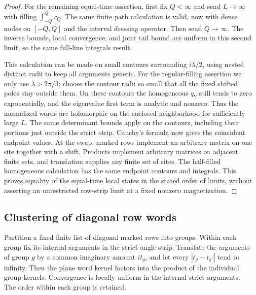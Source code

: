\begin{proof}
For the remaining equal-time assertion, first fix $Q<\infty$
and send $L\to\infty$ with filling
$\int_{-Q}^Qr_Q$.  The same finite path calculation is valid,
now with dense nodes on $[-Q,Q]$ and the interval dressing
operator.  Then send $Q\to\infty$.
The inverse bounds, local convergence, and joint tail bound
are uniform in this second limit, so the same full-line integrals
result.

This calculation can be made on small contours surrounding
$i\lambda/2$, using nested distinct radii to keep all arguments
generic.  For the regular-filling assertion we only use
$\lambda>2\pi/3$; choose the contour radii so small that all the
fixed shifted poles stay outside them.
On these contours the homogeneous $q_Y$ still tends to zero
exponentially, and the eigenvalue first term is analytic and
nonzero.  Thus the normalized words are holomorphic on the
enclosed neighborhood for sufficiently large $L$.
The same determinant bounds apply on the contours, including
their portions just outside the strict strip.
Cauchy's formula now gives the coincident endpoint values.
At the swap, marked rows implement an arbitrary matrix on one
site together with a shift.  Products implement arbitrary
matrices on adjacent finite sets, and translation supplies any
finite set of sites.  The half-filled homogeneous calculation
has the same endpoint contours and integrals.  This proves
equality of the equal-time local states in the stated order of
limits, without asserting an unrestricted row-strip limit at a
fixed nonzero magnetization.
\end{proof}

\subsection{Clustering of diagonal row words}

\begin{proposition}\label{prop:word-clustering}
Partition a fixed finite list of diagonal marked rows into groups.
Within each group fix its internal arguments in the strict angle
strip.  Translate the arguments of group $g$ by a common imaginary
amount $it_g$, and let every $|t_g-t_{g'}|$ tend to infinity.
Then the plane word kernel factors into the product of the
individual group kernels.  Convergence is locally uniform in
the internal strict arguments.  The order within each group is
retained.
\end{proposition}

